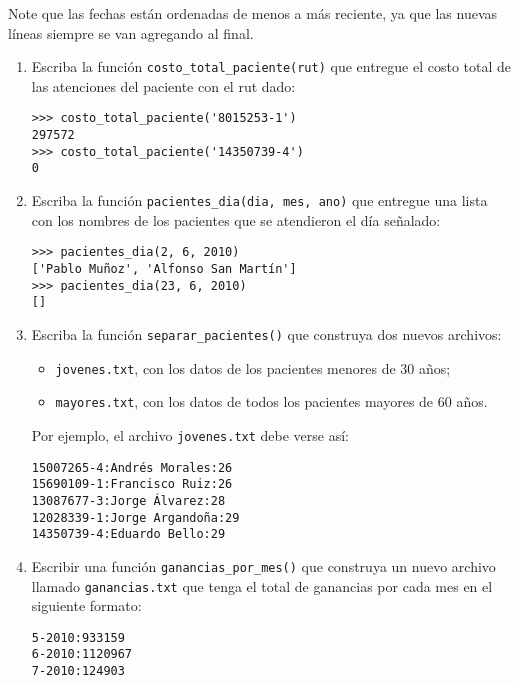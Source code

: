 Note que las fechas están ordenadas de menos a más reciente, ya que las
nuevas líneas siempre se van agregando al final.

\begin{enumerate}
\item
  Escriba la función \lstinline!costo_total_paciente(rut)! que entregue
  el costo total de las atenciones del paciente con el rut dado:

\begin{lstlisting}
>>> costo_total_paciente('8015253-1')
297572
>>> costo_total_paciente('14350739-4')
0
\end{lstlisting}
\item
  Escriba la función \lstinline!pacientes_dia(dia, mes, ano)! que
  entregue una lista con los nombres de los pacientes que se atendieron
  el día señalado:

\begin{lstlisting}
>>> pacientes_dia(2, 6, 2010)
['Pablo Muñoz', 'Alfonso San Martín']
>>> pacientes_dia(23, 6, 2010)
[]
\end{lstlisting}
\item
  Escriba la función \lstinline!separar_pacientes()! que construya dos
  nuevos archivos:

  \begin{itemize}
  \item
    \lstinline!jovenes.txt!, con los datos de los pacientes menores de
    30 años;
  \item
    \lstinline!mayores.txt!, con los datos de todos los pacientes
    mayores de 60 años.
  \end{itemize}

  Por ejemplo, el archivo \lstinline!jovenes.txt! debe verse así:

\begin{lstlisting}
15007265-4:Andrés Morales:26
15690109-1:Francisco Ruiz:26
13087677-3:Jorge Álvarez:28
12028339-1:Jorge Argandoña:29
14350739-4:Eduardo Bello:29
\end{lstlisting}
\item
  Escribir una función \lstinline!ganancias_por_mes()! que construya un
  nuevo archivo llamado \lstinline!ganancias.txt! que tenga el total de
  ganancias por cada mes en el siguiente formato:

\begin{lstlisting}
5-2010:933159
6-2010:1120967
7-2010:124903
\end{lstlisting}
\end{enumerate}
